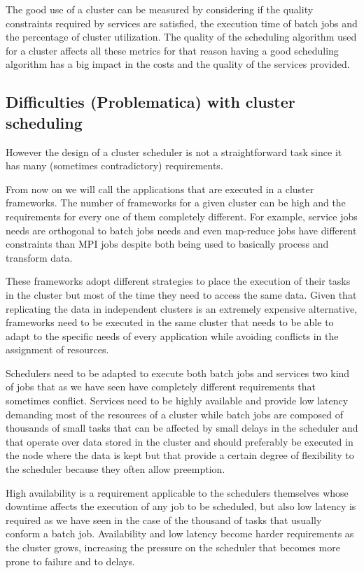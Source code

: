 \documentclass{svjour3}                     %
\begin{document}
The good use of a cluster can be measured by considering if the
quality constraints required by services are satisfied, the execution
time of batch jobs and the percentage of cluster utilization. The
quality of the scheduling algorithm used for a cluster affects all
these metrics for that reason having a good scheduling algorithm has a big
impact in the costs and the quality of the services provided.

\subsection{Difficulties (Problematica) with cluster scheduling}

However the design of a cluster scheduler is not a straightforward
task since it has many (sometimes contradictory) requirements.

From now on we will call the applications that are executed in a
cluster frameworks.  The number of frameworks for a given cluster can
be high and the requirements for every one of them completely
different. For example, service jobs needs are orthogonal to batch
jobs needs and even map-reduce \cite{dean_mapreduce:_2008} jobs have
different constraints than MPI \cite{gabriel04:_open_mpi} jobs despite
both being used to basically process and transform data.

These frameworks adopt different strategies to place the
execution of their tasks in the cluster but most of the
time they need to access the same data. Given that replicating the
data in independent clusters is an extremely expensive alternative, frameworks
need to be executed in the same cluster that needs to be able to adapt
to the specific needs of every application while avoiding conflicts in
the assignment of resources.

Schedulers need to be adapted to execute both batch jobs and services
two kind of jobs that as we have seen have completely different
requirements that sometimes conflict. Services need to be highly
available and provide low latency demanding most of the resources of a
cluster while batch jobs are composed of thousands of small tasks that
can be affected by small delays in the scheduler and that operate over
data stored in the cluster and should preferably be executed in the
node where the data is kept but that provide a certain degree of
flexibility to the scheduler because they often allow preemption.

High availability is a requirement applicable to the schedulers
themselves whose downtime affects the execution of any job to be
scheduled, but also low latency is required as we have seen in the
case of the thousand of tasks that usually conform a batch
job. Availability and low latency become harder requirements as the
cluster grows, increasing the pressure on the scheduler that becomes
more prone to failure and to delays.
\end{document}
